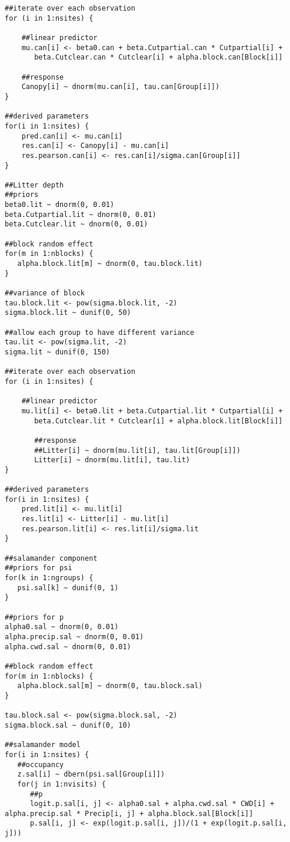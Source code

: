 \begin{lstlisting}
##iterate over each observation
for (i in 1:nsites) {

    ##linear predictor  
    mu.can[i] <- beta0.can + beta.Cutpartial.can * Cutpartial[i] + 
       beta.Cutclear.can * Cutclear[i] + alpha.block.can[Block[i]]

    ##response
    Canopy[i] ~ dnorm(mu.can[i], tau.can[Group[i]])
}

##derived parameters
for(i in 1:nsites) {
    pred.can[i] <- mu.can[i]
    res.can[i] <- Canopy[i] - mu.can[i]
    res.pearson.can[i] <- res.can[i]/sigma.can[Group[i]]
}

##Litter depth
##priors
beta0.lit ~ dnorm(0, 0.01)
beta.Cutpartial.lit ~ dnorm(0, 0.01)
beta.Cutclear.lit ~ dnorm(0, 0.01)

##block random effect
for(m in 1:nblocks) {
   alpha.block.lit[m] ~ dnorm(0, tau.block.lit)
}

##variance of block
tau.block.lit <- pow(sigma.block.lit, -2)
sigma.block.lit ~ dunif(0, 50)

##allow each group to have different variance
tau.lit <- pow(sigma.lit, -2)
sigma.lit ~ dunif(0, 150)

##iterate over each observation
for (i in 1:nsites) {

    ##linear predictor  
    mu.lit[i] <- beta0.lit + beta.Cutpartial.lit * Cutpartial[i] + 
       beta.Cutclear.lit * Cutclear[i] + alpha.block.lit[Block[i]]

       ##response
       ##Litter[i] ~ dnorm(mu.lit[i], tau.lit[Group[i]])
       Litter[i] ~ dnorm(mu.lit[i], tau.lit)
}

##derived parameters
for(i in 1:nsites) {
    pred.lit[i] <- mu.lit[i]
    res.lit[i] <- Litter[i] - mu.lit[i]
    res.pearson.lit[i] <- res.lit[i]/sigma.lit
}

##salamander component
##priors for psi
for(k in 1:ngroups) {
   psi.sal[k] ~ dunif(0, 1)
}

##priors for p
alpha0.sal ~ dnorm(0, 0.01)
alpha.precip.sal ~ dnorm(0, 0.01)
alpha.cwd.sal ~ dnorm(0, 0.01)

##block random effect
for(m in 1:nblocks) {
   alpha.block.sal[m] ~ dnorm(0, tau.block.sal)
}

tau.block.sal <- pow(sigma.block.sal, -2)
sigma.block.sal ~ dunif(0, 10)

##salamander model
for(i in 1:nsites) {
   ##occupancy
   z.sal[i] ~ dbern(psi.sal[Group[i]])
   for(j in 1:nvisits) {
      ##p
      logit.p.sal[i, j] <- alpha0.sal + alpha.cwd.sal * CWD[i] + alpha.precip.sal * Precip[i, j] + alpha.block.sal[Block[i]]
      p.sal[i, j] <- exp(logit.p.sal[i, j])/(1 + exp(logit.p.sal[i, j]))


\end{lstlisting}
